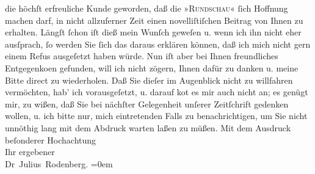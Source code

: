 \begin{ledgroupsized}[t]{13cm}
               die höchſt erfreuliche Kunde geworden, daß die »\textsc{Rundschau}« ſich Hoffnung machen darf, in nicht allzuferner Zeit einen novelliſtiſchen
               Beitrag von Ihnen zu erhalten. Längſt ſchon iſt dieß mein Wunſch geweſen u. wenn ich
               ihn nicht eher ausſprach, ſo werden Sie ſich das daraus erklären können, daß ich mich
               nicht gern einem Refus ausgeſetzt haben würde. Nun iſt aber bei Ihnen freundliches
                  Entgegenko{\geminationm}en gefunden, will ich nicht zögern, Ihnen
               dafür zu danken u. meine Bitte direct zu wiederholen. Daß Sie dieſer im Augenblick
               nicht zu willfahren vermöchten, hab’ ich vorausgeſetzt, u. darauf ko{\geminationm}t es mir auch nicht an; es genügt mir, zu wißen, daß
               Sie bei nächſter Gelegenheit unſerer Zeitſchrift gedenken wollen, u. {\pb}ich bitte nur, mich eintretenden Falls zu
               benachrichtigen, um Sie nicht unnöthig lang mit dem Abdruck warten laßen zu
               müßen.\pend
           \pstart
           Mit dem Ausdruck beſonderer Hochachtung{\\[\baselineskip]}Ihr ergebener{\\[\baselineskip]}\spacefill\mbox{Dr Julius Rodenberg.}\pend
           \leftskip=0em{}
         
         \endnumbering{}\end{ledgroupsized}  \newcommand{\dateiname}{L00749}\newcommand{\titel}{Julius Rodenberg an Arthur Schnitzler, 13. 12. 1897}\newcommand{\editorInnen}{Martin Anton Müller und Gerd-Hermann Susen}
      